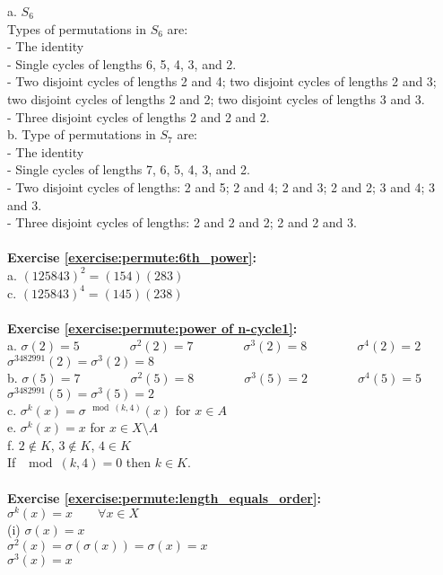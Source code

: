 a. $S_6$\\
Types of permutations in $S_6$ are:\\
- The identity\\
- Single cycles of lengths 6, 5, 4, 3, and 2.\\
- Two disjoint cycles of lengths 2 and 4; two disjoint cycles of lengths 2 and 3; two disjoint cycles of lengths 2 and 2; two disjoint cycles of lengths 3 and 3.\\
- Three disjoint cycles of lengths 2 and 2 and 2.\\
b. Type of permutations in $S_7$ are:\\
- The identity\\
- Single cycles of lengths 7, 6, 5, 4, 3, and 2.\\
- Two disjoint cycles of lengths: 2 and 5; 2 and 4; 2 and 3; 2 and 2; 3 and 4; 3 and 3.\\
- Three disjoint cycles of lengths: 2 and 2 and 2; 2 and 2 and 3.\\
\\
\textbf{Exercise \ref{exercise:permute:6th_power}:}\\
a. $(125843)^2=(154)(283)$\\
c. $(125843)^4=(145)(238)$\\
\\
\textbf{Exercise \ref{exercise:permute:power of n-cycle1}:}\\
a. $\sigma(2)=5\qquad\qquad\sigma^2(2)=7\qquad\qquad\sigma^3(2)=8\qquad\qquad\sigma^4(2)=2$\\
$\sigma^{3482991}(2)=\sigma^3(2)=8$\\
b. $\sigma(5)=7\qquad\qquad\sigma^2(5)=8\qquad\qquad\sigma^3(5)=2\qquad\qquad\sigma^4(5)=5$\\
$\sigma^{3482991}(5)=\sigma^3(5)=2$\\
c. $\sigma^k(x)=\sigma^{\mod(k,4)}(x)$ for $x\in A$\\
e. $\sigma^k(x)=x$ for $x\in X\setminus A$\\
f. $2\not\in K$, $3\not\in K$, $4\in K$\\
If $\mod(k,4)=0$ then $k\in K$.\\
\\
\textbf{Exercise \ref{exercise:permute:length_equals_order}:}\\
$\sigma^k(x)=x\qquad\forall x\in X$\\
(i) $\sigma(x)=x$\\
$\sigma^2(x)=\sigma(\sigma(x))=\sigma(x)=x$\\
$\sigma^3(x)=x$\\

